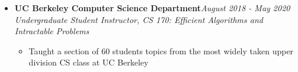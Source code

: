 \documentclass[letterpaper,8pt]{article}
\newcommand{\resitem}[1]{\item #1 \vspace{-1pt}}
\begin{document}
{\begin{itemize}





    \item
	\textbf{UC Berkeley Computer Science Department}\hfill{\textit{August 2018 - May 2020}} \\
	\textit{Undergraduate Student Instructor, CS 170: Efficient Algorithms and Intractable Problems}
	\begin{itemize}[noitemsep,nolistsep]
		\resitem{\small{Taught a section of 60 students topics from the most widely taken upper division CS class at UC Berkeley}}
	\end{itemize}



\end{itemize}}
\end{document}
